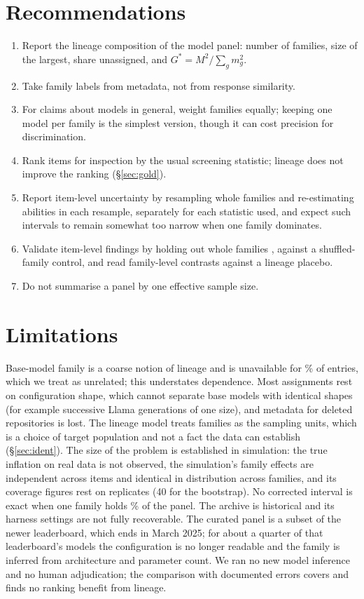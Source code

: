 \documentclass[10pt]{article}
\theoremstyle{remark}\newtheorem{remark}{Remark}
\begin{document}
\section{Recommendations}\label{sec:recs}
\begin{enumerate}\itemsep2pt
\item Report the lineage composition of the model panel: number of families,
  size of the largest, share unassigned, and $G^\ast=M^2/\sum_g m_g^2$.
\item Take family labels from metadata, not from response similarity.
\item For claims about models in general, weight families equally; keeping one
  model per family is the simplest version, though it can cost precision for
  discrimination.
\item Rank items for inspection by the usual screening statistic; lineage does
  not improve the ranking (\S\ref{sec:gold}).
\item Report item-level uncertainty by resampling whole families and
  re-estimating abilities in each resample, separately for each statistic
  used, and expect such intervals to remain somewhat too narrow when one
  family dominates.
\item Validate item-level findings by holding out whole families
  \citep[as][do for score prediction]{yax2025phylolm}, against a
  shuffled-family control, and read family-level contrasts against a lineage
  placebo.
\item Do not summarise a panel by one effective sample size.
\end{enumerate}

\section{Limitations}\label{sec:limitations}
Base-model family is a coarse notion of lineage and is unavailable for
\UnassignedShare\% of entries, which we treat as unrelated; this understates
dependence. Most assignments rest on configuration shape, which cannot
separate base models with identical shapes (for example successive Llama
generations of one size), and metadata for deleted repositories is lost. The
lineage model treats families as the sampling units, which is a choice of
target population and not a fact the data can establish (\S\ref{sec:ident}).
The size of the problem is established in simulation: the true inflation on
real data is not observed, the simulation's family effects are independent
across items and identical in distribution across families, and its coverage
figures rest on \SimReps{} replicates (40 for the bootstrap). No corrected interval is
exact when one family holds \LargestFamilyShare\% of the panel. The archive is
historical and its harness settings are not fully recoverable. The curated
panel is a subset of the newer leaderboard, which ends in March 2025; for
about a quarter of that leaderboard's models the configuration is no longer
readable and the family is inferred from architecture and parameter count. We ran no
new model inference and no human adjudication; the comparison with documented
errors covers \GoldBenchmarks{} and finds no ranking benefit from lineage.
\end{document}
